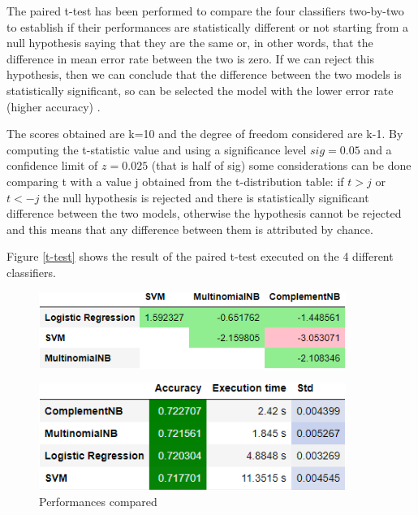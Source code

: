 The paired t-test has been performed to compare the four classifiers two-by-two to establish if their performances are statistically different or not starting from a null hypothesis saying that they are the same or, in other words, that the difference in mean error rate between the two is zero. If we can reject this hypothesis, then we can conclude that the difference between the two models is statistically significant, so can be selected the model with the lower error rate (higher accuracy) \cite{book}.

The scores obtained are k=10 and the degree of freedom considered are k-1. By computing the t-statistic value and using a significance level \begin{math}sig = 0.05\end{math} and a confidence limit of \begin{math}z = 0.025\end{math} (that is half of sig) some considerations can be done comparing t with a value j obtained from the t-distribution table: if \begin{math}t > j\end{math} or \begin{math}t < -j\end{math} the null hypothesis is rejected and there is statistically significant difference between the two models, otherwise the hypothesis cannot be rejected and this means that any difference between them is attributed by chance.

\vspace{5mm}

\noindent
Figure \ref{t-test} shows the result of the paired t-test executed on the 4 different classifiers.


\begin{figure}[H]
\centering
\includegraphics[width=10cm]{images/training/t_test_result.png}
\caption{Student T-test result}
\label{t-test}

\begin{figure}[H]
\end{figure}
\centering
\includegraphics[width=10cm]{images/training/best_cv.png}
\caption{Performances compared}
\end{figure}

